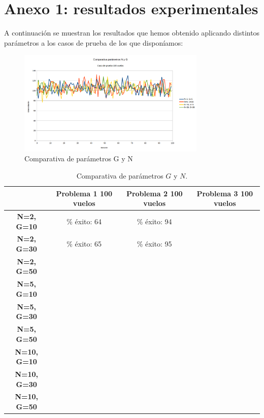 \chapter{Anexo 1: resultados experimentales}
\label{anexo1}

A continuación se muestran los resultados que hemos obtenido aplicando distintos parámetros a los casos de prueba de los que disponíamos:

\begin{figure}[H]
	\begin{center}
		\centering
		\includegraphics[width=0.8\textwidth]{./imagenes/heuristico/comparativa_parametros_100_vuelos.png}
		\caption{Comparativa de parámetros G y N}
		\label{fig: Comparativa de parámetros G y N}
	\end{center}
\end{figure}


\begin{table}[htbp]
	\centering
	\caption{Comparativa de parámetros $G$ y $N$.}
	\label{fig: comparativa de parámetros $G$ y $N$.}
	\begin{tabular}{|c|c|c|c|}
		\hline
		& \textbf{Problema 1
			100 vuelos} & \textbf{Problema 2
			100 vuelos} & \textbf{Problema 3
			100 vuelos} \\ \hline
		\textbf{N=2, G=10} & \% éxito: 64 & \% éxito: 94 &  \\ \hline
		\textbf{N=2, G=30} & \% éxito: 65 & \% éxito: 95 &  \\ \hline
		\textbf{N=2, G=50} &  &  &  \\ \hline
		\textbf{N=5, G=10} &  &  &  \\ \hline
		\textbf{N=5, G=30} &  &  &  \\ \hline
		\textbf{N=5, G=50} &  &  &  \\ \hline
		\textbf{N=10, G=10} &  &  &  \\ \hline
		\textbf{N=10, G=30} &  &  &  \\ \hline
		\textbf{N=10, G=50} &  &  &  \\ \hline
	\end{tabular}
	
\end{table}


